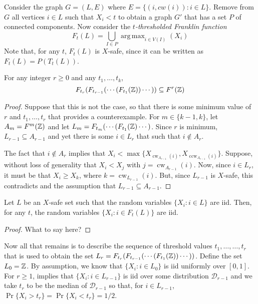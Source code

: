 \documentclass{patmorin}
\DeclareMathOperator*{\argmax}{arg\,max}
\DeclareMathOperator{\cw}{cw}
\DeclareMathOperator{\ccw}{ccw}
\begin{document}
Consider the graph $G=(L,E)$ where $E=\{(i,cw(i)): i\in L\}$. Remove
from $G$ all vertices $i\in L$ such that $X_i < t$ to obtain a graph
$G'$ that has a set $P$ of connected components.  Now consider the
\emph{$t$-thresholded Franklin function}
\[
    F_t(L) = \bigcup_{I\in P} \argmax_{i\in V(I)}(X_i)
\]
Note that, for any $t$, $F_t(L)$ is $X$-safe, since it can be written
as $F_t(L) = P(T_t(L))$.

\begin{lem}
   For any integer $r\ge 0$ and any $t_1,\ldots,t_k$,
   \[  F_{t_r}(F_{t_{r-1}}(\cdots(F_{t_1}(\mathbb{Z}))\cdots )) \subseteq F^{r}(\mathbb{Z})   \]
\end{lem}

\begin{proof}
   Suppose that this is not the case, so that there is some
   minimum value of $r$ and $t_1,\ldots,t_r$ that provides a
   counterexample.  For $m\in\{k-1,k\}$, let $A_m=F^{m}(\mathbb{Z})$ and let
   $L_m=F_{t_m}(\cdots(F_{t_1}(\mathbb{Z})\cdots)$.  Since $r$ is minimum,
   $L_{r-1}\subseteq A_{r-1}$ and yet there is some $i\in L_r$ that such
   that $i\not\in A_r$.

   The fact that $i\not\in A_r$ implies that $X_i
   < \max\{X_{\cw_{A_{r-1}}(i)},X_{\ccw_{A_{r-1}}(i)}\}$.
   Suppose, without loss of generality that $X_i < X_j$ with $j =
   \cw_{A_{r-1}}(i)$.  Now, since $i\in L_r$, it must be that $X_i
   \ge X_k$, where $k=\cw_{L_{r-1}}(i)$.  But, since $L_{r-1}$ is
   $X$-safe, this contradicts  and the assumption that
   $L_{r-1}\subseteq A_{r-1}$.
\end{proof}

\begin{lem}
   Let $L$ be an $X$-safe set such that the random variables $\{X_i:i\in
   L\}$ are iid.  Then, for any $t$, the random variables $\{X_i: i\in
   F_t(L)\}$ are iid.
\end{lem}

\begin{proof}
   What to say here?
\end{proof}

Now all that remains is to describe the sequence of threshold
values $t_1,\ldots,\ldots,t_r$ that is used to obtain the set $L_r =
F_{t_r}(F_{t_{r-1}}(\cdots(F_{t_1}(\mathbb{Z}))\cdots))$.  Define the set $L_0=\mathbb{Z}$.
By assumption, we know that $\{X_i:i\in L_0\}$ is iid uniformly over
$[0,1]$.  For $r\ge 1$,  implies that $\{X_i:i\in
L_{r-1}\}$ is iid over some distribution $\mathcal{D}_{r-1}$ and we take
$t_r$ to be the median of $\mathcal{D}_{r-1}$ so that, for $i\in L_{r-1}$,
$\Pr\{X_i > t_r\}=\Pr\{X_i < t_r\} = 1/2$.
\end{document}
